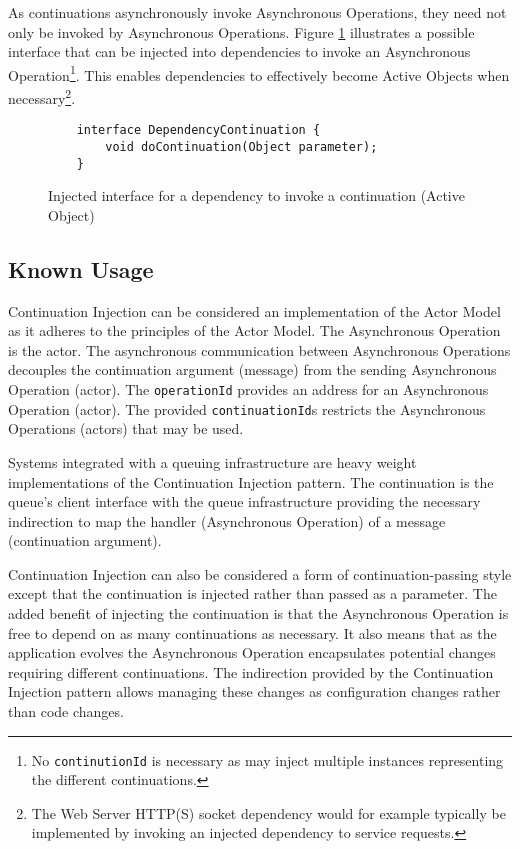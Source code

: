 \documentclass[prodmode]{style/acmlarge}
\begin{document}
As continuations asynchronously invoke Asynchronous Operations, they need not
only be invoked by Asynchronous Operations. Figure \ref{fig:DC_interface}
illustrates a possible interface that can be injected into dependencies to
invoke an Asynchronous Operation\footnote{No \texttt{continutionId} is necessary
as may inject multiple instances representing the different continuations.}.
This enables dependencies to effectively become Active Objects
\cite{active-object} when necessary\footnote{The Web Server HTTP(S) socket
dependency would for example typically be implemented by invoking an injected
dependency to service requests.}.

\begin{figure}[tp]
\begin{verbatim}
    interface DependencyContinuation {
        void doContinuation(Object parameter);
    }
\end{verbatim}
\caption{Injected interface for a dependency to invoke a continuation (Active Object)}
\label{fig:DC_interface}
\end{figure}


\subsection{Known Usage}

Continuation Injection can be considered an implementation of the Actor Model
\cite{actors} as it adheres to the principles of the Actor Model.  The
Asynchronous Operation is the actor.  The asynchronous communication between
Asynchronous Operations decouples the continuation argument (message) from the
sending Asynchronous Operation (actor).  The \texttt{operationId} provides an
address for an Asynchronous Operation (actor).  The provided
\texttt{continuationId}s restricts the Asynchronous Operations (actors) that may
be used.

Systems integrated with a queuing infrastructure are heavy weight
implementations of the Continuation Injection pattern.  The continuation is the
queue's client interface with the queue infrastructure providing the necessary
indirection to map the handler (Asynchronous Operation) of a message
(continuation argument).

Continuation Injection can also be considered a form of continuation-passing
style \cite{continuations} except that the continuation is injected rather than
passed as a parameter.  The added benefit of injecting the continuation is that
the Asynchronous Operation is free to depend on as many continuations as
necessary.  It also means that as the application evolves the Asynchronous
Operation encapsulates potential changes requiring different continuations.  The
indirection provided by the Continuation Injection pattern allows managing these
changes as configuration changes rather than code changes.
\end{document}
